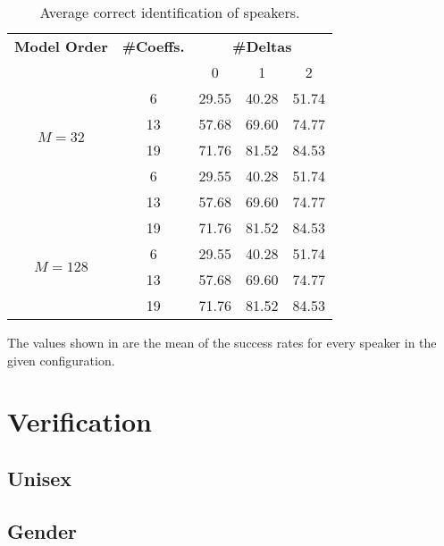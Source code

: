 \begin{table}[h]
    \centering
    \begin{tabular}{|c|c|c|c|c|}
        \hline
        \textbf{Model Order} & \textbf{\#Coeffs.} \multirow{2}{*} & \multicolumn{3}{c|}{\textbf{\#Deltas}} \\ \cline{3-5}
        & & 0 & 1 & 2 \\
        \hline
        \multirow{4}{*}{$M = 32$} & 6 & 29.55 & 40.28 & 51.74 \\ \cline{2-5}
        & 13 & 57.68 & 69.60 & 74.77 \\ \cline{2-5}
        & 19 & 71.76 & 81.52 & 84.53 \\ \cline{2-5}
        \hline
        \multirow{3}{*}{$M = 64$} & 6 & 29.55 & 40.28 & 51.74 \\ \cline{2-5}
        & 13 & 57.68 & 69.60 & 74.77 \\ \cline{2-5}
        & 19 & 71.76 & 81.52 & 84.53 \\ \cline{2-5}
        \hline
        \multirow{2}{*}{$M = 128$} & 6 & 29.55 & 40.28 & 51.74 \\ \cline{2-5}
        & 13 & 57.68 & 69.60 & 74.77 \\ \cline{2-5}
        & 19 & 71.76 & 81.52 & 84.53 \\ \cline{2-5}
        \hline
    \end{tabular}
    \caption{Average correct identification of speakers.}
    \label{table:avg-correctness}
\end{table}

\noindent The values shown in  are the mean of the success rates for every speaker in the given configuration.

\section{Verification}

\subsection{Unisex}

\subsection{Gender}